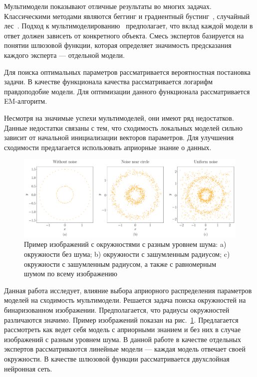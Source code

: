 \documentclass[12pt, twoside]{article}
\numberwithin{equation}{section}
\begin{document}
Мультимодели показывают отличные результаты во многих задачах. Классическими методами являются беггинг и градиентный бустинг~\cite{Tianqi2016}, случайный лес~\cite{Ishwaran2012}. Подход к мультимоделированию~\cite{Yuksel2012} предполагает, что вклад каждой модели в ответ должен зависеть от конкретного объекта. Смесь экспертов базируется на понятии шлюзовой функции, которая определяет значимость предсказания каждого эксперта --- отдельной модели.

Для поиска оптимальных параметров рассматривается вероятностная постановка задачи. В качестве функционала качества рассматривается логарифм правдоподобие модели. Для оптимизации данного функционала рассматривается EM-алгоритм.

Несмотря на значимые успехи мультимоделей, они имеют ряд недостатков. Данные недостатки связаны с тем, что сходимость локальных моделей сильно зависит от начальной инициализации векторов параметров. Для улучшения сходимости предлагается использовать априорные знание о данных.

\begin{figure}[h!t]\center
\includegraphics[width=1\textwidth]{result/statment}
\caption{Пример изображений с окружностями с разным уровнем шума: a) окружности без шума; b) окружности с зашумленным радиусом; c) окружности с зашумленным радиусом, а также с равномерным шумом по всему изображению}
\label{example:1}
\end{figure}

Данная работа исследует, влияние выбора априорного распределения параметров моделей на сходимость мультимодели. Решается задача поиска окружностей на бинаризованном изображении. Предполагается, что радиусы окружностей различаются значимо. Пример изображений показан на рис.~\ref{example:1}. Предлагается рассмотреть как ведет себя модель с априорными знанием и без них в случае изображений с разным уровнем шума. В данной работе в качестве отдельных экспертов рассматриваются линейные модели --- каждая модель отвечает своей окружности. В качестве шлюзовой функции рассматривается двухслойная нейронная сеть.
\end{document}

